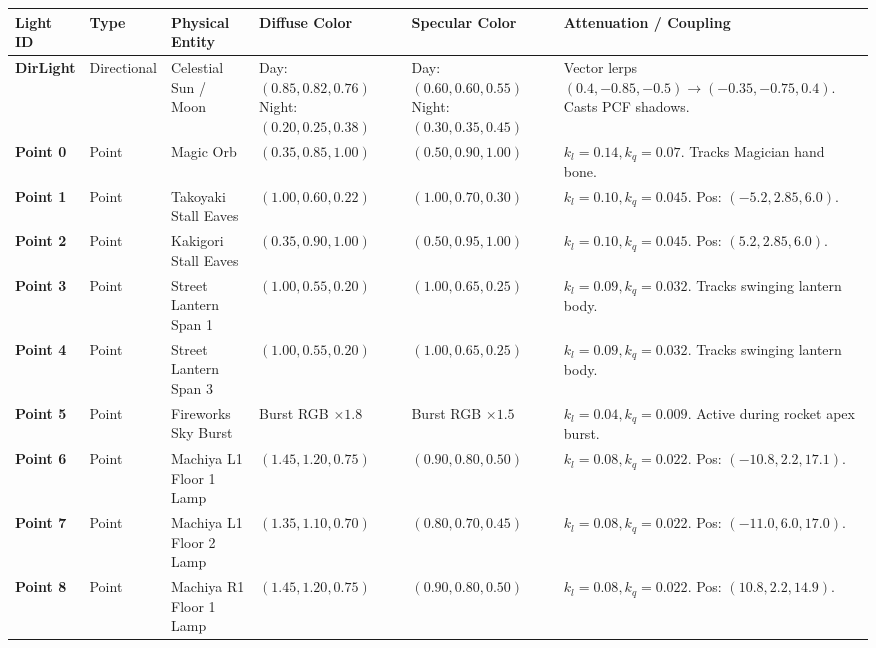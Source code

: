 \begin{table}[htbp]
\centering
\scriptsize
\renewcommand{\arraystretch}{0.90}
\begin{tabularx}{\textwidth}{p{1.4cm} p{1.6cm} p{2.8cm} p{2.3cm} p{2.3cm} p{3.2cm}}
\toprule
\textbf{Light ID} & \textbf{Type} & \textbf{Physical Entity} & \textbf{Diffuse Color} & \textbf{Specular Color} & \textbf{Attenuation / Coupling} \\
\midrule
\textbf{DirLight} & Directional & Celestial Sun / Moon & Day: $(0.85, 0.82, 0.76)$ \newline Night: $(0.20, 0.25, 0.38)$ & Day: $(0.60, 0.60, 0.55)$ \newline Night: $(0.30, 0.35, 0.45)$ & Vector lerps $(0.4, -0.85, -0.5) \to (-0.35, -0.75, 0.4)$. Casts PCF shadows. \\
\addlinespace
\textbf{Point 0} & Point & Magic Orb & $(0.35, 0.85, 1.00)$ & $(0.50, 0.90, 1.00)$ & $k_l = 0.14, k_q = 0.07$. Tracks Magician hand bone. \\
\addlinespace
\textbf{Point 1} & Point & Takoyaki Stall Eaves & $(1.00, 0.60, 0.22)$ & $(1.00, 0.70, 0.30)$ & $k_l = 0.10, k_q = 0.045$. Pos: $(-5.2, 2.85, 6.0)$. \\
\addlinespace
\textbf{Point 2} & Point & Kakigori Stall Eaves & $(0.35, 0.90, 1.00)$ & $(0.50, 0.95, 1.00)$ & $k_l = 0.10, k_q = 0.045$. Pos: $(5.2, 2.85, 6.0)$. \\
\addlinespace
\textbf{Point 3} & Point & Street Lantern Span 1 & $(1.00, 0.55, 0.20)$ & $(1.00, 0.65, 0.25)$ & $k_l = 0.09, k_q = 0.032$. Tracks swinging lantern body. \\
\addlinespace
\textbf{Point 4} & Point & Street Lantern Span 3 & $(1.00, 0.55, 0.20)$ & $(1.00, 0.65, 0.25)$ & $k_l = 0.09, k_q = 0.032$. Tracks swinging lantern body. \\
\addlinespace
\textbf{Point 5} & Point & Fireworks Sky Burst & Burst RGB $\times 1.8$ & Burst RGB $\times 1.5$ & $k_l = 0.04, k_q = 0.009$. Active during rocket apex burst. \\
\addlinespace
\textbf{Point 6} & Point & Machiya L1 Floor 1 Lamp & $(1.45, 1.20, 0.75)$ & $(0.90, 0.80, 0.50)$ & $k_l = 0.08, k_q = 0.022$. Pos: $(-10.8, 2.2, 17.1)$. \\
\addlinespace
\textbf{Point 7} & Point & Machiya L1 Floor 2 Lamp & $(1.35, 1.10, 0.70)$ & $(0.80, 0.70, 0.45)$ & $k_l = 0.08, k_q = 0.022$. Pos: $(-11.0, 6.0, 17.0)$. \\
\addlinespace
\textbf{Point 8} & Point & Machiya R1 Floor 1 Lamp & $(1.45, 1.20, 0.75)$ & $(0.90, 0.80, 0.50)$ & $k_l = 0.08, k_q = 0.022$. Pos: $(10.8, 2.2, 14.9)$. \\

\end{tabularx}
\end{table}
